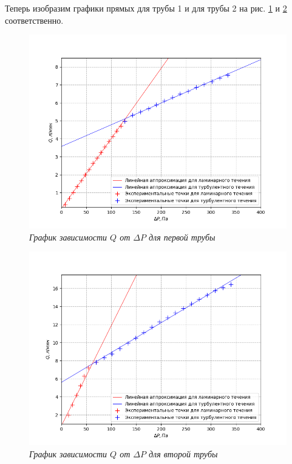 \documentclass[a4paper,12pt]{article}
\begin{document}
Теперь изобразим графики прямых для трубы 1 и для трубы 2 на рис. \ref{graph:p-q-1} и \ref{graph:p-q-2} соответственно.

\begin{figure}[h!]
        \centering
	\includegraphics[width=1\textwidth]{graph_p-q_1.png}
	\caption{\textit{График зависимости $Q$ от $\Delta P$ для первой трубы}}
	\label{graph:p-q-1}
\end{figure}

\begin{figure}[h!]
        \centering
	\includegraphics[width=1\textwidth]{graph_p-q_2.png}
	\caption{\textit{График зависимости $Q$ от $\Delta P$ для второй трубы}}
	\label{graph:p-q-2}
\end{figure}
\end{document}
